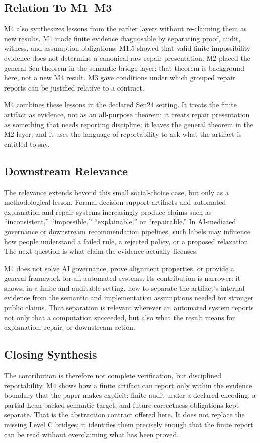 \subsection{Relation To M1--M3}

M4 also synthesizes lessons from the earlier layers without re-claiming them
as new results. M1 made finite evidence diagnosable by separating proof,
audit, witness, and assumption obligations. M1.5 showed that valid finite
impossibility evidence does not determine a canonical raw repair
presentation. M2 placed the general Sen theorem in the semantic bridge layer;
that theorem is background here, not a new M4 result. M3 gave conditions under
which grouped repair reports can be justified relative to a contract.

M4 combines these lessons in the declared Sen24 setting. It treats the finite
artifact as evidence, not as an all-purpose theorem; it treats repair
presentation as something that needs reporting discipline; it leaves the
general theorem in the M2 layer; and it uses the language of reportability to
ask what the artifact is entitled to say.

\subsection{Downstream Relevance}

The relevance extends beyond this small social-choice case, but only as a
methodological lesson. Formal decision-support artifacts and automated
explanation and repair systems increasingly produce claims such as
``inconsistent,'' ``impossible,'' ``explainable,'' or ``repairable.'' In
AI-mediated governance or downstream recommendation pipelines, such labels may
influence how people understand a failed rule, a rejected policy, or a
proposed relaxation. The next question is what claim the evidence actually
licenses.

M4 does not solve AI governance, prove alignment properties, or provide a
general framework for all automated systems. Its contribution is narrower: it
shows, in a finite and auditable setting, how to separate the artifact's
internal evidence from the semantic and implementation assumptions needed for
stronger public claims. That separation is relevant wherever an automated
system reports not only that a computation succeeded, but also what the result
means for explanation, repair, or downstream action.

\subsection{Closing Synthesis}

The contribution is therefore not complete verification, but disciplined
reportability. M4 shows how a finite artifact can report only within the
evidence boundary that the paper makes explicit: finite audit under a declared
encoding, a partial Lean-backed semantic target, and future correctness
obligations kept separate. That is the abstraction contract offered here. It
does not replace the missing Level C bridges; it identifies them precisely
enough that the finite report can be read without overclaiming what has been
proved.
